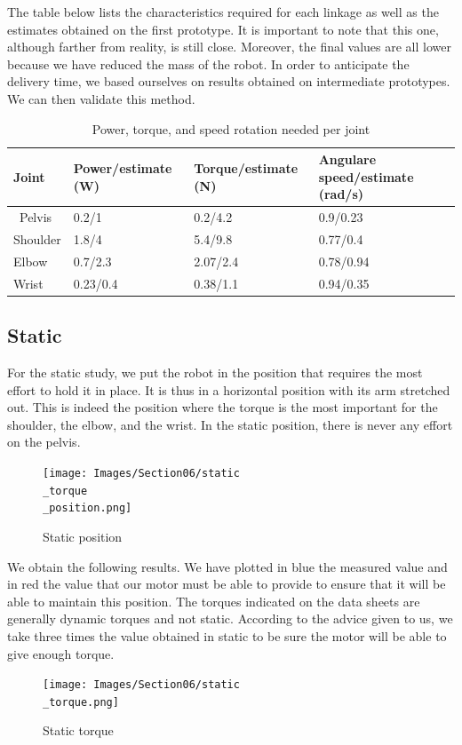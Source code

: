 \bigbreak
The table below lists the characteristics required for each linkage as well as the estimates obtained on the first prototype. It is important to note that this one, although farther from reality, is still close. Moreover, the final values are all lower because we have reduced the mass of the robot. In order to anticipate the delivery time, we based ourselves on results obtained on intermediate prototypes. We can then validate this method. 

\begin{table}[ht]
    \centering
    \begin{tabular}{|p{1.5cm} | p{4cm} | p{4cm}|p{5cm} |} 
        \hline
        \textbf{Joint} & \textbf{Power/estimate (W)} & \textbf{Torque/estimate (N)}& \textbf{Angulare speed/estimate (rad/s)}\\ [0.3ex] 
        \hline\
        Pelvis & 0.2/1 & 0.2/4.2 & 0.9/0.23 \\ 
        \hline
        Shoulder & 1.8/4 & 5.4/9.8 & 0.77/0.4 \\ 
        \hline
        Elbow & 0.7/2.3 & 2.07/2.4 & 0.78/0.94 \\ 
        \hline
        Wrist & 0.23/0.4 & 0.38/1.1 & 0.94/0.35 \\ 
        \hline
    \end{tabular}
    \caption{Power, torque, and speed rotation needed per joint}
\end{table}
\FloatBarrier

\subsection{Static}

For the static study, we put the robot in the position that requires the most effort to hold it in place. It is thus in a horizontal position with its arm stretched out. This is indeed the position where the torque is the most important for the shoulder, the elbow, and the wrist. In the static position, there is never any effort on the pelvis.
\begin{figure}[ht]
    \centering
    \texttt{[image: Images/Section06/static\\\_torque\\\_position.png]}
    \caption{Static position}
    \label{fig:StaticPosition}
\end{figure}
\FloatBarrier

\bigbreak
We obtain the following results. We have plotted in blue the measured value and in red the value that our motor must be able to provide to ensure that it will be able to maintain this position. The torques indicated on the data sheets are generally dynamic torques and not static. According to the advice given to us, we take three times the value obtained in static to be sure the motor will be able to give enough torque.
\begin{figure}[ht]
    \centering
    \texttt{[image: Images/Section06/static\\\_torque.png]}
    \caption{Static torque}
    \label{fig:StaticTorque}
\end{figure}
\FloatBarrier

